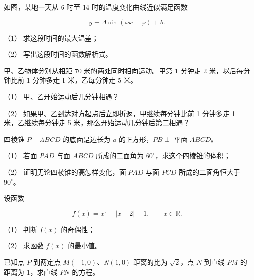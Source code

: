 \Needspace{0.4\textheight}
\begin{question}
如图，某地一天从 6 时至 14 时的温度变化曲线近似满足函数

\nopagebreak[4]
\[
y=A\sin(\omega x+\varphi)+b.
\]
\nopagebreak[4]
\begin{center}\end{center}
\nopagebreak[4]
（1） 求这段时间的最大温差；

（2） 写出这段时间的函数解析式。

\end{question}
\begin{question}
甲、乙物体分别从相距 70 米的两处同时相向运动。甲第 1 分钟走 2 米，以后每分钟比前 1 分钟多走 1 米，乙每分钟走 5 米。

（1） 甲、乙开始运动后几分钟相遇？

（2） 如果甲、乙到达对方起点后立即折返，甲继续每分钟比前 1 分钟多走 1 米，乙继续每分钟走 5 米，那么开始运动几分钟后第二相遇？

\Needspace{0.4\textheight}
\end{question}
\begin{question}
四棱锥 $P-ABCD$ 的底面是边长为 $a$ 的正方形，$PB\perp$ 平面 $ABCD$。
\nopagebreak[4]
\begin{center}\end{center}
\nopagebreak[4]
（1） 若面 $PAD$ 与面 $ABCD$ 所成的二面角为 $60^\circ$，求这个四棱锥的体积；

（2） 证明无论四棱锥的高怎样变化，面 $PAD$ 与面 $PCD$ 所成的二面角恒大于 $90^\circ$。

\end{question}
\begin{question}
设函数

\nopagebreak[4]
\[
f(x)=x^2+|x-2|-1,\qquad x\in\mathbb R.
\]

（1） 判断 $f(x)$ 的奇偶性；

（2） 求函数 $f(x)$ 的最小值。

\end{question}
\begin{question}
已知点 $P$ 到两定点 $M(-1,0)\text{、}N(1,0)$ 距离的比为 $\sqrt2$，点 $N$ 到直线 $PM$ 的距离为 $1$，求直线 $PN$ 的方程。

\Needspace{0.4\textheight}
\end{question}
